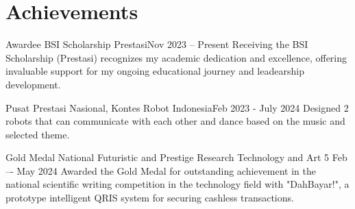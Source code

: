 \section{Achievements}
\resumeSubHeadingListStart
    
    \achiSubheading
    {Awardee BSI Scholarship Prestasi}{Nov 2023 -- Present}
    {Receiving the BSI Scholarship (Prestasi) recognizes my academic dedication and excellence, offering invaluable support for my ongoing educational journey and leadearship development.}{}

    \achiSubheading
    {Pusat Prestasi Nasional, Kontes Robot Indonesia}{Feb 2023 - July 2024}
    {Designed 2 robots that can communicate with each other and dance based on the music and selected theme.}{}
    \resumeItemListStart
    \resumeItemListEnd

    \achiSubheading
    {Gold Medal National Futuristic and Prestige Research Technology and Art 5 }{Feb –- May 2024}
    {Awarded the Gold Medal for outstanding achievement in the national scientific writing competition in the technology field with "DahBayar!", a prototype intelligent QRIS system for securing cashless transactions.}{}
    


\resumeSubHeadingListEnd